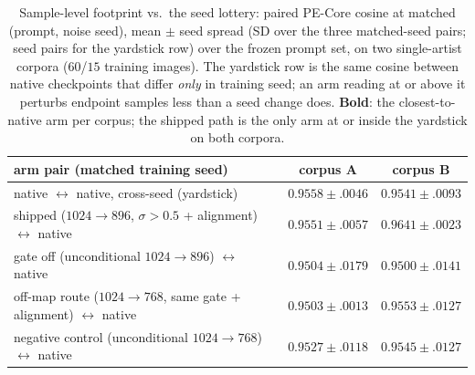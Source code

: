\begin{table}[t]
\caption{Sample-level footprint vs.\ the seed lottery: paired PE-Core
cosine at matched (prompt, noise seed), mean $\pm$ seed spread (SD over
the three matched-seed pairs; seed pairs for the yardstick row) over
the frozen prompt set, on two single-artist corpora ($60$/$15$
training images). The yardstick row is the same cosine between native
checkpoints that differ \emph{only} in training seed; an arm reading
at or above it perturbs endpoint samples less than a seed change does.
\textbf{Bold}: the closest-to-native arm per corpus; the shipped path
is the only arm at or inside the yardstick on both corpora.}
\label{tab:yardstick}
\centering
\small
\setlength{\tabcolsep}{5pt}
\begin{tabular}{lcc}
\toprule
arm pair (matched training seed) & corpus A & corpus B \\
\midrule
native $\leftrightarrow$ native, cross-seed (yardstick) & $0.9558 \pm .0046$ & $0.9541 \pm .0093$ \\
\midrule
shipped ($1024{\to}896$, $\sigma{>}0.5$ + alignment) $\leftrightarrow$ native & $\mathbf{0.9551 \pm .0057}$ & $\mathbf{0.9641 \pm .0023}$ \\
gate off (unconditional $1024{\to}896$) $\leftrightarrow$ native & $0.9504 \pm .0179$ & $0.9500 \pm .0141$ \\
off-map route ($1024{\to}768$, same gate + alignment) $\leftrightarrow$ native & $0.9503 \pm .0013$ & $0.9553 \pm .0127$ \\
negative control (unconditional $1024{\to}768$) $\leftrightarrow$ native & $0.9527 \pm .0118$ & $0.9545 \pm .0127$ \\
\bottomrule
\end{tabular}
\end{table}

